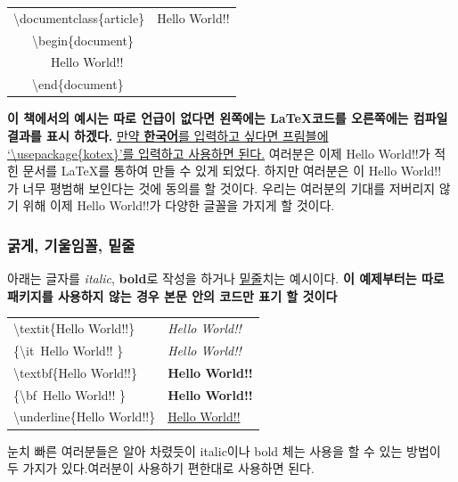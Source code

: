 \documentclass[12pt]{article}
\begin{document}
		\begin{tabularx}{\textwidth \onehalfspacing}{ |X|X| }		
			\hline
			\textbackslash documentclass\{article\}&Hello World!!\\
			\ \ \ \textbackslash begin\{document\}		& \\
			\ \ \ \ \ \ Hello World!!			& \\
			\ \ \ \textbackslash end\{document\}			& \\
			\hline
		\end{tabularx}
		\newline
		\newline
	{\bf 이 책에서의 예시는 따로 언급이 없다면 왼쪽에는 \LaTeX 코드를 오른쪽에는 컴파일 결과를 표시 하겠다.}\newline
	\underline{만약 {\bf 한국어}를 입력하고 싶다면 프림블에 `\textbackslash usepackage\{kotex\}'를 입력하고 사용하면 된다.}\newline\newline
	여러분은 이제 Hello World!!가 적힌 문서를 \LaTeX 를 통하여 만들 수 있게 되었다. 하지만 여러분은 이 Hello World!! 가 너무 평범해 보인다는 것에 동의를 할 것이다. 우리는 여러분의 기대를 저버리지 않기 위해 이제 Hello World!!가 다양한 글꼴을 가지게 할 것이다.
	\subsubsection{굵게, 기울임꼴, 밑줄}
	아래는 글자를 {\it italic}, {\bf bold}로 작성을 하거나 \underline{밑줄}치는 예시이다.
	\newline
	{\bf 이 예제부터는 따로 패키지를 사용하지 않는 경우 본문 안의 코드만 표기 할 것이다}\newline
	
	\begin{tabularx}{\textwidth \onehalfspacing}{ |X|X| }
		\hline
		\textbackslash textit\{Hello World!!\} & \textit{Hello World!!}\\
		\{\textbackslash it\ Hello World!! \} & {\it Hello World!!}\\
		\hline
		\textbackslash textbf\{Hello World!!\} & \textbf{Hello World!!}\\
		\{\textbackslash bf\ Hello World!! \} & {\bf Hello World!!}\\
		\hline
		\textbackslash underline\{Hello World!!\} & \underline{Hello World!!}\\
		\hline
	\end{tabularx}
	\newline
	\newline
	눈치 빠른 여러분들은 알아 차렸듯이 italic이나 bold 체는 사용을 할 수 있는 방법이 두 가지가 있다.여러분이 사용하기 편한대로 사용하면 된다.
	\clearpage
\end{document}
